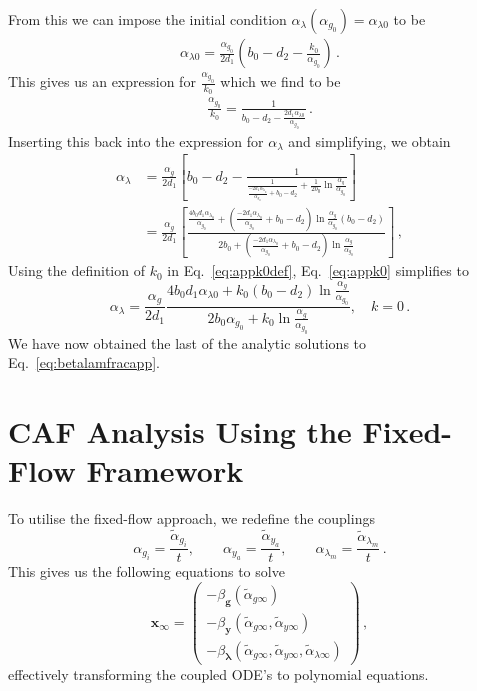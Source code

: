 From this we can impose the initial condition $\alpha_{\lambda} (\alpha_{g_0}) = \alpha_{\lambda0}$ to be
\begin{align}
\alpha_{\lambda0} = \frac{\alpha_{g_0}}{2d_1} \left( b_0 - d_2 - \frac{k_0}{\alpha_{g_0}} \right)\, .
\end{align}
This gives us an expression for $\frac{\alpha_{g_0}}{k_0}$ which we find to be
\begin{align}
    \frac{\alpha_{g_0}}{k_0} = \frac{1}{b_0 - d_2 - \frac{2d_1\alpha_{\lambda0}}{\alpha_{g_0}}} \,.\label{eq:appk0def}
\end{align}
Inserting this back into the expression for $\alpha_\lambda$ and simplifying, we obtain
\begin{align}
    \alpha_\lambda &= \frac{\alpha_g}{2d_1} \left[ b_0 - d_2 - \frac{1}{\frac{1}{\frac{-2d_1\alpha_{\lambda_0}}{\alpha_{g_0}} + b_0 - d_2}+ \frac{1}{2b_0} \ln \frac{\alpha_q}{\alpha_{g_0}}}  \right]
    \nonumber\\&=\frac{\alpha_g}{2d_1} \left[ \frac{\frac{4b_0d_1\alpha_{\lambda_0}}{\alpha_{g_0}}+\left(\frac{-2d_1\alpha_{\lambda_0}}{\alpha_{g_0}} + b_0 - d_2\right)\ln \frac{\alpha_g}{\alpha_{g_0}}(b_0-d_2)}{{2b_0} + \left(\frac{-2d_1\alpha_{\lambda_0}}{\alpha_{g_0}} + b_0 - d_2\right) \ln \frac{\alpha_g}{\alpha_{g_0}}} \right]\,,\label{eq:appk0}
\end{align}
Using the definition of $k_0$ in Eq.~\eqref{eq:appk0def}, Eq.~\eqref{eq:appk0} simplifies to
\begin{equation}
    \boxed{\alpha_{\lambda} = \frac{\alpha_g}{2d_1} \frac{ 4b_0 d_1 \alpha_{\lambda0} + k_0 (b_0 - d_2) \ln\frac{\alpha_g}{\alpha_{g_0}} }{ 2b_0 \alpha_{g_0} + k_0 \ln\frac{\alpha_g}{\alpha_{g_0}} } , \quad k=0 \,.}
    \label{eq:appalphalamkeq0}
\end{equation}
We have now obtained the last of the analytic solutions to Eq.~\eqref{eq:betalamfracapp}.


\section{CAF Analysis Using the Fixed-Flow Framework} 
To utilise the fixed-flow approach, we redefine the couplings 
\begin{equation}
    \alpha_{g_i} = \frac{\tilde \alpha_{g_i}}{t}, \quad \quad  \alpha_{y_a} = \frac{\tilde \alpha_{y_a}}
    {t}, \quad \quad \alpha_{\lambda_m} = \frac{\tilde \alpha_{\lambda_m}}{t} \,.
\end{equation}
This gives us the following equations to solve
\begin{equation}
     \boldsymbol{x}_\infty=\begin{pmatrix}
        -\beta_{{\boldsymbol{g}}}(\tilde\alpha_{g\infty})\\-\beta_{{\boldsymbol{y}}}(\tilde\alpha_{g\infty},\tilde\alpha_{y\infty})\\-\beta_{\boldsymbol{\lambda}}(\tilde\alpha_{g\infty},\tilde\alpha_{y\infty},\tilde\alpha_{\lambda\infty})
    \end{pmatrix}\label{eq:solCAF2app}\,,
\end{equation}
effectively transforming the coupled ODE's to polynomial equations.

